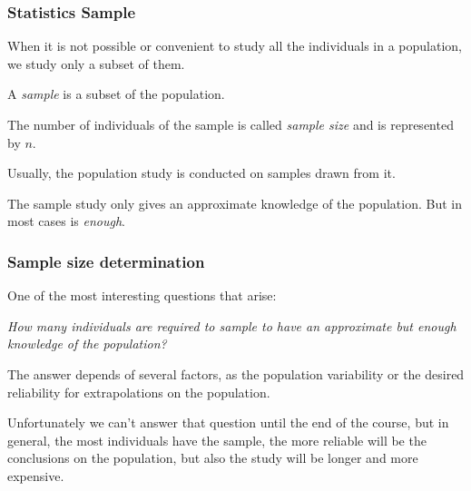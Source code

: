 \begin{frame}
\frametitle{Statistics Sample}
When it is not possible or convenient to study all the individuals in a population, we study only a subset of them. 

\begin{definition}[Sample]
A \emph{sample} is a subset of the population.
\end{definition}

\begin{definition}
The number of individuals of the sample is called \emph{sample size} and is represented by $n$.
\end{definition}

Usually, the population study is conducted on samples drawn from it. 

The sample study only gives an approximate knowledge of the population. But in most cases is \emph{enough}.
\end{frame}


\begin{frame}
\frametitle{Sample size determination}
One of the most interesting questions that arise:
\begin{center}
\alert{\emph{How many individuals are required to sample to have an approximate but enough knowledge of the
population?}}
\end{center}

The answer depends of several factors, as the population variability or the desired reliability for extrapolations on
the population.

Unfortunately we can't answer that question until the end of the course, but in general, the most individuals have the
sample, the more reliable will be the conclusions on the population, but also the study will be longer and more
expensive.
\end{frame}



